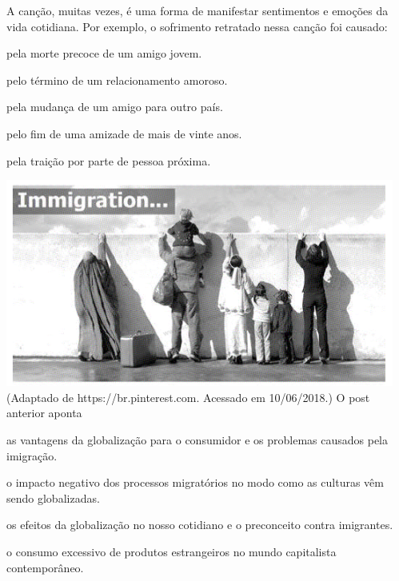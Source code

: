 A canção, muitas vezes, é uma forma de manifestar sentimentos e emoções da vida cotidiana. Por exemplo, o sofrimento retratado nessa canção foi causado:

\begin{alternativas}
  \item pela morte precoce de um amigo jovem.
  \item pelo término de um relacionamento amoroso.
  \item pela mudança de um amigo para outro país.
  \item pelo fim de uma amizade de mais de vinte anos.
  \item pela traição por parte de pessoa próxima.
\end{alternativas}


\questao
\includegraphics[width=\columnwidth]{subareas/linguagens/ingles-1.png}
 {
  (Adaptado de https://br.pinterest.com. Acessado em 10/06/2018.)
}
O post anterior aponta
\begin{alternativas}
  \item as vantagens da globalização para o consumidor e os problemas causados pela imigração.
  \item o impacto negativo dos processos migratórios no modo como as culturas vêm sendo globalizadas.
  \item os efeitos da globalização no nosso cotidiano e o preconceito contra imigrantes.
  \item o consumo excessivo de produtos estrangeiros no mundo capitalista contemporâneo.
\end{alternativas}

